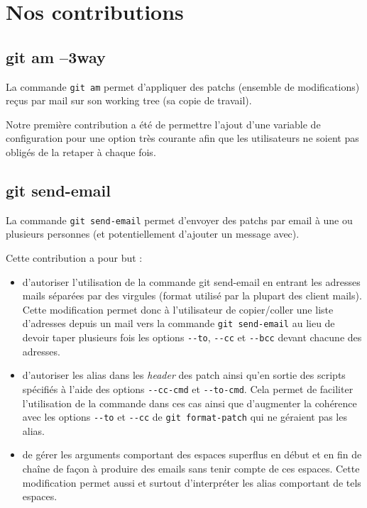 \documentclass[a4paper, 12pt]{article}
\newcommand{\gitcmd}[1]{\lstinline|#1|}
\newcommand{\tech}[1]{\emph{#1}}
\begin{document}
\section{Nos contributions}

\subsection{git am --3way}

La commande \gitcmd{git am} permet d'appliquer des patchs (ensemble de
modifications) reçus par mail sur son working tree (sa copie de
travail).

Notre première contribution a été de permettre l'ajout d'une variable de configuration pour une option très courante afin que les utilisateurs ne soient pas obligés de la retaper à chaque fois.

\subsection{git send-email}

La commande \gitcmd{git send-email} permet d'envoyer des patchs par
email à une ou plusieurs
personnes (et potentiellement d'ajouter un message avec).

Cette contribution a pour but :

\begin{itemize}
\item d'autoriser l'utilisation de la commande git send-email en entrant
  les adresses mails séparées par des virgules (format
  utilisé par la plupart des client mails). Cette modification permet
  donc à l'utilisateur de copier/coller une liste d'adresses depuis un
  mail vers la commande \gitcmd{git send-email} au lieu de devoir
  taper plusieurs fois les options \gitcmd{--to}, \gitcmd{--cc} et
  \gitcmd{--bcc} devant chacune des adresses. 
\item d'autoriser les alias dans les \tech{header} des patch ainsi qu'en
  sortie des scripts spécifiés à l'aide des options \gitcmd{--cc-cmd}
  et \gitcmd{--to-cmd}. Cela permet de faciliter l'utilisation de la
  commande dans ces cas ainsi que d'augmenter la cohérence avec
  les options \gitcmd{--to} et \gitcmd{--cc} de \gitcmd{git format-patch} 
  qui ne géraient pas les alias.
\item de gérer les arguments comportant des espaces superflus en début et
  en fin de chaîne de façon à produire des emails sans tenir compte de ces
  espaces. Cette modification permet aussi et surtout d'interpréter
  les alias comportant de tels espaces. 
\end{itemize}
\end{document}
